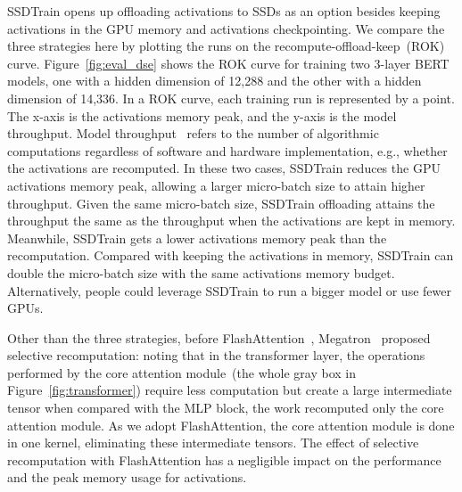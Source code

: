 SSDTrain opens up offloading activations to SSDs as an option besides keeping activations in the GPU memory and activations checkpointing. We compare the three strategies here by plotting the runs on the recompute-offload-keep~(ROK) curve.  
Figure~\ref{fig:eval_dse} shows the ROK curve for training two 3-layer BERT models, one with a hidden dimension of 12,288 and the other with a hidden dimension of 14,336. In a ROK curve, each training run is represented by a point. The x-axis is the activations memory peak, and the y-axis is the model throughput. Model throughput~\cite{shoeybiMegatronLMTrainingMultiBillion2020a} refers to the number of algorithmic computations  regardless of software and hardware implementation, e.g., whether the activations are recomputed.
In these two cases, SSDTrain reduces the GPU activations memory peak, allowing a larger micro-batch size to attain higher throughput. Given the same micro-batch size, SSDTrain offloading attains the throughput the same as the throughput when the activations are kept in memory. Meanwhile, SSDTrain gets a lower activations memory peak than the recomputation. Compared with keeping the activations in memory, SSDTrain can double the micro-batch size with the same activations memory budget. Alternatively, people could leverage SSDTrain to run a bigger model or use fewer GPUs.



Other than the three strategies, before FlashAttention~\cite{daoFlashAttentionFastMemoryEfficient2022}, Megatron~\cite{korthikantiReducingActivationRecomputation2022} proposed selective recomputation:
noting that in the transformer layer, the operations performed by the core attention module~(the whole gray box in Figure~\ref{fig:transformer}) require less computation but create a large intermediate tensor when compared with the MLP block, the work recomputed only the core attention module.
As we adopt FlashAttention, the core attention module is done in one kernel, eliminating these intermediate tensors.  The effect of selective recomputation with FlashAttention has a negligible impact on the performance and the peak memory usage for activations.



